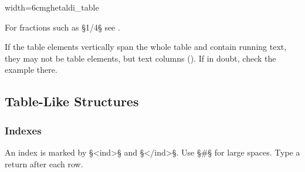 \vspace{3mm}
\begin{sampleImageSmall}{width=6cm}{ghetaldi_table}

\end{sampleImageSmall}

\vspace{-5mm}
\begin{crossref}
For fractions such as §{1/4}§ see .
\end{crossref}

\vspace{3mm}
\begin{note}
If the table elements vertically span the whole table and contain running text, they may not be table elements, but text columns (). If in doubt, check the example there.
\end{note}



\tocspace
\subsection{Table-Like Structures}
\label{section table-like structures}

\subsubsection{Indexes}
\label{section indexes}

\begin{mainrule}
An index is marked by §<ind>§ and §</ind>§. Use §#§ for large spaces. Type a return after each row. 
\end{mainrule}

